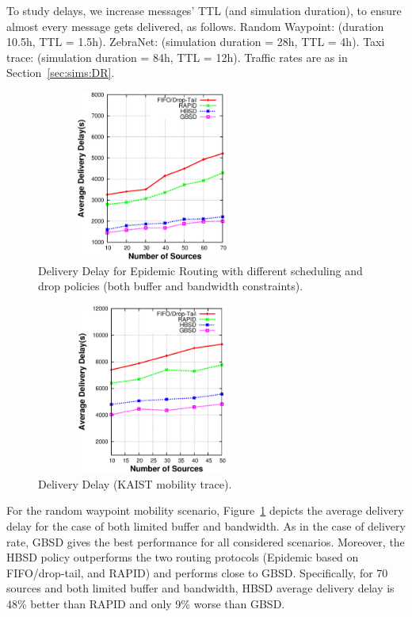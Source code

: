 To study delays, we increase messages' TTL (and simulation duration), to ensure almost every message gets delivered, as follows. Random Waypoint: (duration 10.5h, TTL = 1.5h). ZebraNet: (simulation duration = 28h, TTL = 4h). Taxi trace:  (simulation duration = 84h, TTL = 12h). Traffic rates are as in Section~\ref{sec:sims:DR}.

\begin{figure}[!h]
\centering
\includegraphics[width=3in,height=2.2in]{Chapitre3/fig3.eps}
\caption{Delivery Delay for Epidemic Routing with different scheduling and drop policies (both buffer and bandwidth constraints).}
\label{DD-RWP}
\end{figure}

\begin{figure}[!h]
\centering
\includegraphics[width=3in,height=2.2in]{Chapitre3/fig33.eps}
\caption{Delivery Delay (KAIST mobility trace).}
\label{DD-KAIST}
\end{figure}

For the random waypoint mobility scenario, Figure~\ref{DD-RWP} depicts the average delivery delay for the case of both limited buffer and
bandwidth. As in the case of delivery rate, GBSD gives the best performance for all considered scenarios. Moreover, the HBSD policy
outperforms the two routing protocols (Epidemic based on FIFO/drop-tail, and RAPID) and performs close to GBSD. Specifically,
for 70 sources and both limited buffer and bandwidth, HBSD average delivery delay is 48\% better than RAPID and only 9\% worse than
GBSD.

